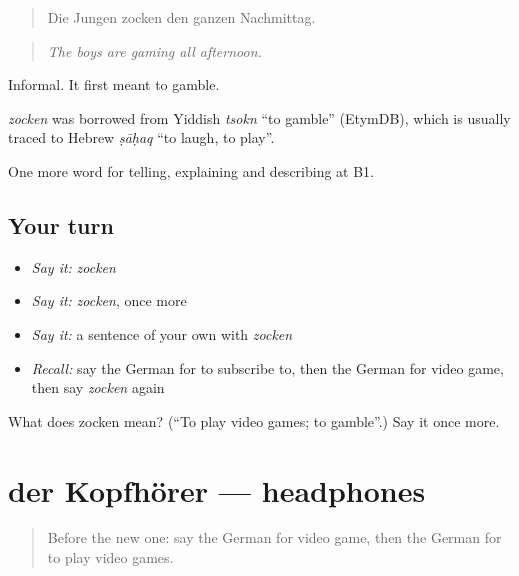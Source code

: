 \begin{quote}
Die Jungen zocken den ganzen Nachmittag.
\end{quote}

\begin{quote}
\emph{The boys are gaming all afternoon.}
\end{quote}

Informal. It first meant to gamble.

\begin{cousinweb}
\emph{zocken} was borrowed from Yiddish \emph{tsokn} \textquotedblleft{}to gamble\textquotedblright{} (EtymDB), which is usually traced to Hebrew \emph{ṣāḥaq} \textquotedblleft{}to laugh, to play\textquotedblright{}.
\end{cousinweb}

\begin{grammarlens}[title={What you've built}]
One more word for telling, explaining and describing at B1.
\end{grammarlens}

\subsection*{Your turn}
\begin{itemize}
\raggedright
  \item \emph{Say it:} \emph{zocken}
  \item \emph{Say it:} \emph{zocken}, once more
  \item \emph{Say it:} a sentence of your own with \emph{zocken}
  \item \emph{Recall:} say the German for to subscribe to, then the German for video game, then say \emph{zocken} again
\end{itemize}

\begin{tcolorbox}[breakable,colback=teal!4,colframe=teal!35!black,title={Before you move on}]
What does zocken mean? (\textquotedblleft{}To play video games; to gamble\textquotedblright{}.) Say it once more.
\end{tcolorbox}
\section[der Kopfhörer]{der Kopfhörer — headphones}

\label{lesson:GE-C525-kopfhoerer}



\begin{quote}
Before the new one: say the German for video game, then the German for to play video games.
\end{quote}

